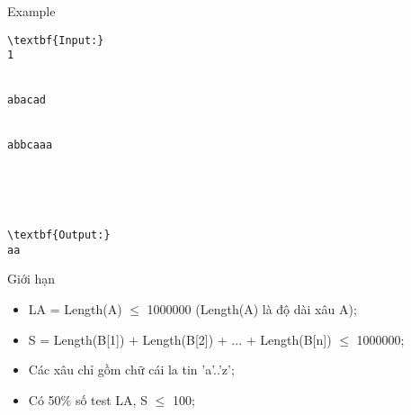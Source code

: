 Example
\begin{verbatim}
\textbf{Input:}
1


abacad


abbcaaa





\textbf{Output:}
aa\end{verbatim}
Giới hạn
\begin{itemize}
	\item     LA = Length(A)  $\le$  1000000 (Length(A) là độ dài xâu A);   
	\item     S = Length(B[1]) + Length(B[2]) + ... + Length(B[n])  $\le$  1000000;   
	\item     Các xâu chỉ gồm chữ cái la tin 'a'..'z';   
	\item     Có 50\% số test LA, S  $\le$  100;   
\end{itemize}